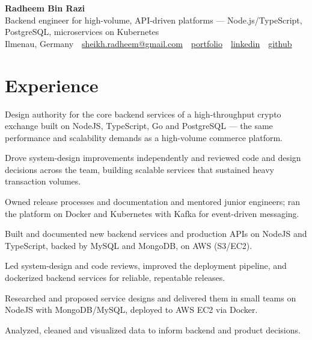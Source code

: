 \documentclass[11pt,a4paper]{resume}
\makeatletter
\newcommand{\Portfolio}{https://radheem.github.io/my-cv}
\newcommand{\PortfolioText}{portfolio}
\newcommand{\GitHub}{https://github.com/radheem}
\newcommand{\LinkedIn}{https://www.linkedin.com/in/radheem-razi}
\newcommand{\Email}{sheikh.radheem@gmail.com}
\makeatother
\begin{document}
\begin{center}
  {\huge\bfseries Radheem Bin Razi}\\[3pt]
  {\large Backend engineer for high-volume, API-driven platforms — Node.js/TypeScript, PostgreSQL, microservices on Kubernetes}\\[6pt]
  \small
  Ilmenau, Germany \,\textbar\,
  \href{mailto:\Email}{\Email} \,\textbar\,
  \href{\Portfolio}{\PortfolioText} \,\textbar\,
  \href{\LinkedIn}{linkedin} \,\textbar\,
  \href{\GitHub}{github}
\end{center}
\vspace{2pt}

\section{Experience}

\bullets
  \item Design authority for the core backend services of a high-throughput crypto exchange built on NodeJS, TypeScript, Go and PostgreSQL — the same performance and scalability demands as a high-volume commerce platform.
  \item Drove system-design improvements independently and reviewed code and design decisions across the team, building scalable services that sustained heavy transaction volumes.
  \item Owned release processes and documentation and mentored junior engineers; ran the platform on Docker and Kubernetes with Kafka for event-driven messaging.
\bulletsend
\vspace{3pt}
\bullets
  \item Built and documented new backend services and production APIs on NodeJS and TypeScript, backed by MySQL and MongoDB, on AWS (S3/EC2).
  \item Led system-design and code reviews, improved the deployment pipeline, and dockerized backend services for reliable, repeatable releases.
\bulletsend
\vspace{3pt}
\bullets
  \item Researched and proposed service designs and delivered them in small teams on NodeJS with MongoDB/MySQL, deployed to AWS EC2 via Docker.
  \item Analyzed, cleaned and visualized data to inform backend and product decisions.
\bulletsend
\vspace{3pt}
\end{document}
